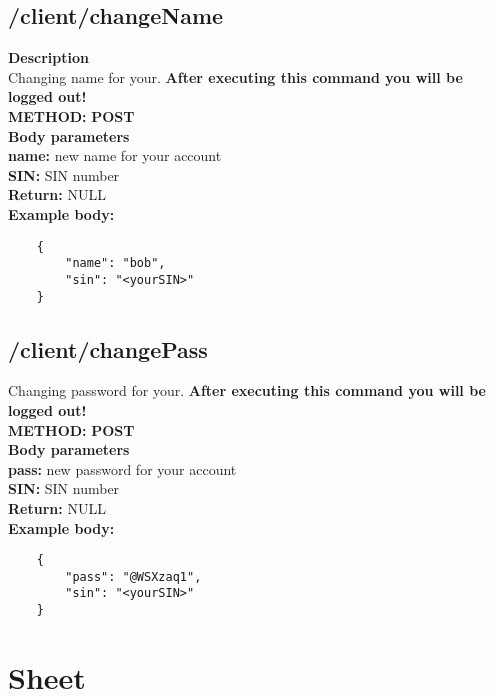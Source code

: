 \documentclass[a4paper, 12pt]{report}
\begin{document}
\subsection{/client/changeName}
\textbf{\color{redText} Description} \\
Changing name for your. \textbf{After executing this command you will be logged out!} \\
\textbf{\color{redText} METHOD: } \textbf{POST} \\
\textbf{\color{redText} Body parameters} \\
\textbf{name: } new name for your account\\
\textbf{SIN: } SIN number\\
\textbf{\color{redText} Return: } NULL\\
\textbf{\color{redText} Example body: }
\begin{lstlisting}
    {
        "name": "bob",
        "sin": "<yourSIN>"
    }
\end{lstlisting}

\subsection{/client/changePass}
Changing password for your. \textbf{After executing this command you will be logged out!} \\
\textbf{\color{redText} METHOD: } \textbf{POST} \\
\textbf{\color{redText} Body parameters} \\
\textbf{pass: } new password for your account\\
\textbf{SIN: } SIN number\\
\textbf{\color{redText} Return: } NULL\\
\textbf{\color{redText} Example body: }
\begin{lstlisting}
    {
        "pass": "@WSXzaq1",
        "sin": "<yourSIN>"
    }
\end{lstlisting}

\section{Sheet}
\end{document}
